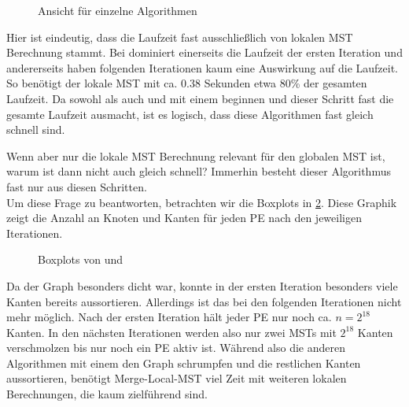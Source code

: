\begin{figure}[H]
    \centering
    
    

    
   
    \caption{Ansicht für einzelne Algorithmen}
    \label{Explicit-dense-Img}
\end{figure}


Hier ist eindeutig, dass die Laufzeit fast ausschließlich von lokalen MST Berechnung stammt. Bei \boruvkaAllreduce dominiert einerseits die Laufzeit der ersten Iteration und andererseits haben folgenden Iterationen kaum eine Auswirkung auf die Laufzeit.
So benötigt der lokale MST mit ca. 0.38 Sekunden etwa 80\% der gesamten Laufzeit. Da sowohl \boruvkaAllreduce als auch \boruvkaThenMerge und \boruvkaMixedMerge mit einem \boruvkaStep beginnen und dieser Schritt fast die gesamte Laufzeit ausmacht, ist es logisch, dass diese Algorithmen fast gleich schnell sind.


Wenn aber nur die lokale MST Berechnung relevant für den globalen MST ist, warum ist dann nicht auch \mergeMST gleich schnell? Immerhin besteht dieser Algorithmus fast nur aus diesen Schritten. \\
Um diese Frage zu beantworten, betrachten wir die Boxplots in \cref{Boxplot-dense-Img}.
Diese Graphik zeigt die Anzahl an Knoten und Kanten für jeden PE nach den jeweiligen Iterationen.



\begin{figure}[H]
    \centering
    
    
    \caption{Boxplots von \mergeMST und \boruvkaAllreduce}
    \label{Boxplot-dense-Img}
\end{figure}

Da der Graph besonders dicht war, konnte \mergeMST in der ersten Iteration besonders viele Kanten bereits aussortieren. Allerdings ist das bei den folgenden Iterationen nicht mehr möglich. Nach der ersten Iteration hält jeder PE nur noch ca. $n=2^{18}$ Kanten. In den nächsten Iterationen werden also nur zwei MSTs mit $2^{18}$ Kanten verschmolzen bis nur noch ein PE aktiv ist.
Während also die anderen Algorithmen mit einem \boruvkaStep den Graph schrumpfen und die restlichen Kanten aussortieren, benötigt Merge-Local-MST viel Zeit mit weiteren lokalen Berechnungen, die kaum zielführend sind. 




